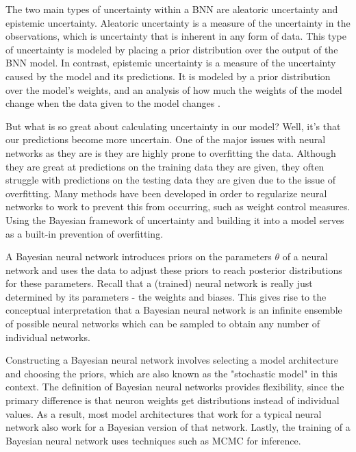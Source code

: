 \documentclass[12pt]{article}
\begin{document}
The two main types of uncertainty within a BNN are aleatoric uncertainty and epistemic uncertainty. Aleatoric uncertainty is a measure of the uncertainty in the observations, which is uncertainty that is inherent in any form of data. This type of uncertainty is modeled by placing a prior distribution over the output of the BNN model. In contrast, epistemic uncertainty is a measure of the uncertainty caused by the model and its predictions. It is modeled by a prior distribution over the model's weights, and an analysis of how much the weights of the model change when the data given to the model changes \cite{shridhar2019comprehensive}.

But what is so great about calculating uncertainty in our model? Well, it's that our predictions become more uncertain. One of the major issues with neural networks as they are is they are highly prone to overfitting the data. Although they are great at predictions on the training data they are given, they often struggle with predictions on the testing data they are given due to the issue of overfitting. Many methods have been developed in order to regularize neural networks to work to prevent this from occurring, such as weight control measures. Using the Bayesian framework of uncertainty and building it into a model serves as a built-in prevention of overfitting.

A Bayesian neural network introduces priors on the parameters $\theta$ of a neural network and uses the data to adjust these priors to reach posterior distributions for these parameters. Recall that a (trained) neural network is really just determined by its parameters - the weights and biases. This gives rise to the conceptual interpretation that a Bayesian neural network is an infinite ensemble of possible neural networks which can be sampled to obtain any number of individual networks. 

Constructing a Bayesian neural network involves selecting a model architecture and choosing the priors, which are also known as the "stochastic model" in this context. The definition of Bayesian neural networks provides flexibility, since the primary difference is that neuron weights get distributions instead of individual values. As a result, most model architectures that work for a typical neural network also work for a Bayesian version of that network. Lastly, the training of a Bayesian neural network uses techniques such as MCMC for inference. 
\end{document}
